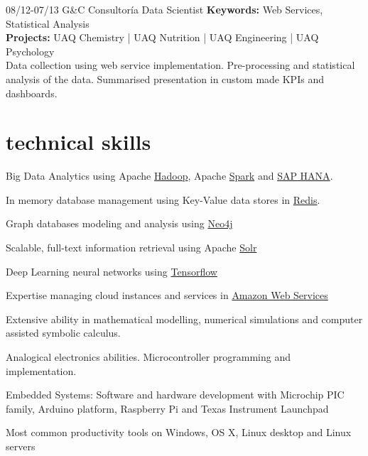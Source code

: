 \documentclass[]{friggeri-cv}
\begin{document}
\begin{entrylist}
\entry
{%
08/12-07/13}
{G\&C Consultor\'{i}a}
{Data Scientist}
{\textbf{Keywords:} Web Services, Statistical Analysis\\
\textbf{Projects:} UAQ Chemistry | UAQ Nutrition | UAQ Engineering | UAQ Psychology \\
\footnotesize Data collection using web service implementation.
Pre-processing and statistical analysis of the data.
Summarised presentation in custom made KPIs and dashboards.
}



%
\end{entrylist}


\section{technical skills}
Big Data Analytics using Apache \href{http://hadoop.apache.org/}{Hadoop}, Apache \href{http://spark.apache.org/}{Spark} and \href{https://hana.sap.com/}{SAP HANA}. 

In memory database management using Key-Value data stores in \href{http://redis.io/}{Redis}.

Graph databases modeling and analysis using \href{https://neo4j.com/}{Neo4j}

Scalable, full-text information retrieval using Apache \href{http://lucene.apache.org/solr/}{Solr}

Deep Learning neural networks using \href{https://www.tensorflow.org/}{Tensorflow}
   
Expertise managing cloud instances and services in \href{http://aws.amazon.com/es/}{Amazon Web Services}

Extensive ability in mathematical modelling, numerical simulations and computer assisted symbolic calculus. 

Analogical electronics abilities. Microcontroller programming and implementation. 

Embedded Systems: Software and hardware development with Microchip PIC family, Arduino platform, Raspberry Pi and Texas Instrument Launchpad

Most common productivity tools on Windows, OS X, Linux desktop and Linux servers
   
\end{document}
